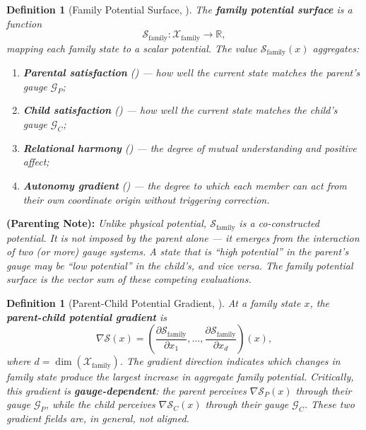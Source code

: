 \documentclass[11pt,a4paper]{article}
\newtheorem{definition}[theorem]{Definition}
\newcommand{\R}{\mathbb{R}}
\newcommand{\cS}{\mathcal{S}}
\newcommand{\cG}{\mathcal{G}}
\newcommand{\gradS}{\nabla\mathcal{S}}
\newcommand{\parentnote}[1]{%
  \medskip\noindent
  \textbf{ (Parenting Note):} \textit{#1}%
}
\begin{document}
\begin{definition}[Family Potential Surface, \textbf{}]
\label{def:family_potential}
The \textbf{family potential surface} is a function
\begin{equation}
    \cS_{\text{family}}: \mathcal{X}_{\text{family}} \to \R,
\end{equation}
mapping each family state to a scalar potential. The value $\cS_{\text{family}}(x)$ aggregates:
\begin{enumerate}[label=(\roman*)]
    \item \textbf{Parental satisfaction} () — how well the current state matches the parent's gauge $\cG_P$;
    \item \textbf{Child satisfaction} () — how well the current state matches the child's gauge $\cG_C$;
    \item \textbf{Relational harmony} () — the degree of mutual understanding and positive affect;
    \item \textbf{Autonomy gradient} () — the degree to which each member can act from their own coordinate origin without triggering correction.
\end{enumerate}
\end{definition}

\parentnote{Unlike physical potential, $\cS_{\text{family}}$ is a \textit{co-constructed} potential. It is not imposed by the parent alone — it emerges from the interaction of two (or more) gauge systems. A state that is ``high potential'' in the parent's gauge may be ``low potential'' in the child's, and vice versa. The family potential surface is the vector sum of these competing evaluations.}

\begin{definition}[Parent-Child Potential Gradient, \textbf{}]
\label{def:pc_gradient}
At a family state $x$, the \textbf{parent-child potential gradient} is
\begin{equation}
    \gradS(x) = \left(\frac{\partial \cS_{\text{family}}}{\partial x_1}, \dots, \frac{\partial \cS_{\text{family}}}{\partial x_d}\right)(x),
\end{equation}
where $d = \dim(\mathcal{X}_{\text{family}})$. The gradient direction indicates which changes in family state produce the largest increase in aggregate family potential. Critically, this gradient is \textbf{gauge-dependent}: the parent perceives $\gradS_P(x)$ through their gauge $\cG_P$, while the child perceives $\gradS_C(x)$ through their gauge $\cG_C$. These two gradient fields are, in general, not aligned.
\end{definition}
\end{document}
